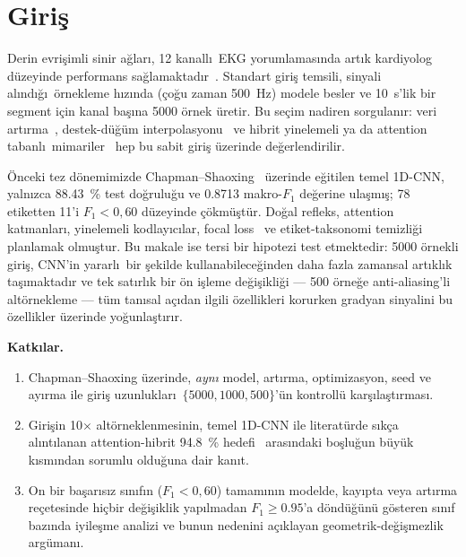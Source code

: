 \documentclass[conference]{IEEEtran}
\begin{document}
\section{Giri\c{s}}
Derin evri\c{s}imli sinir a\u{g}lar\i, 12 kanall\i\ EKG yorumlamas\i nda
art\i k kardiyolog d\"{u}zeyinde performans
sa\u{g}lamaktad\i r~\cite{rajpurkar2017,hannun2019,strodthoff2020}.
Standart giri\c{s} temsili, sinyali al\i nd\i\u{g}\i\ \"{o}rnekleme h\i z\i nda
(\c{c}o\u{g}u zaman \SI{500}{\hertz}) modele besler ve
\SI{10}{\second}'lik bir segment i\c{c}in kanal ba\c{s}\i na \num{5000}
\"{o}rnek \"{u}retir. Bu se\c{c}im nadiren sorgulan\i r: veri
art\i rma~\cite{iwana2021,wang2020}, destek-d\"{u}\u{g}\"{u}m
interpolasyonu~\cite{chen2021,xu2022} ve hibrit yinelemeli ya da
attention tabanl\i\ mimariler~\cite{oh2018,strodthoff2020} hep bu sabit
giri\c{s} \"{u}zerinde de\u{g}erlendirilir.

\"{O}nceki tez d\"{o}nemimizde Chapman--Shaoxing~\cite{zheng2020} \"{u}zerinde
e\u{g}itilen temel 1D-CNN, yaln\i zca \SI{88,43}{\percent} test
do\u{g}rulu\u{g}u ve \num{0,8713} makro-$F_1$ de\u{g}erine ula\c{s}m\i\c{s};
\num{78} etiketten \num{11}'i $F_1<0,60$ d\"{u}zeyinde
\c{c}\"{o}km\"{u}\c{s}t\"{u}r. Do\u{g}al refleks, attention katmanlar\i,
yinelemeli kodlay\i c\i lar, focal loss~\cite{lin2017} ve etiket-taksonomi
temizli\u{g}i planlamak olmu\c{s}tur. Bu makale ise tersi bir hipotezi
test etmektedir: \num{5000} \"{o}rnekli giri\c{s}, CNN'in yararl\i\ bir
\c{s}ekilde kullanabilece\u{g}inden daha fazla zamansal art\i kl\i k
ta\c{s}\i maktad\i r ve tek sat\i rl\i k bir \"{o}n i\c{s}leme
de\u{g}i\c{s}ikli\u{g}i --- \num{500} \"{o}rne\u{g}e anti-aliasing'li
alt\"{o}rnekleme --- t\"{u}m tan\i sal a\c{c}\i dan ilgili \"{o}zellikleri
korurken gradyan sinyalini bu \"{o}zellikler \"{u}zerinde
yo\u{g}unla\c{s}t\i r\i r.

\noindent\textbf{Katk\i lar.}
\begin{enumerate}
  \item Chapman--Shaoxing \"{u}zerinde, \emph{ayn\i} model, art\i rma,
        optimizasyon, seed ve ay\i rma ile giri\c{s} uzunluklar\i\
        $\{\num{5000}, \num{1000}, \num{500}\}$'\"{u}n kontroll\"{u}
        kar\c{s}\i la\c{s}t\i rmas\i.
  \item Giri\c{s}in 10$\times$ alt\"{o}rneklenmesinin, temel 1D-CNN ile
        literat\"{u}rde s\i k\c{c}a al\i nt\i lanan attention-hibrit
        \SI{94,8}{\percent} hedefi~\cite{oh2018} aras\i ndaki bo\c{s}lu\u{g}un
        b\"{u}y\"{u}k k\i sm\i ndan sorumlu oldu\u{g}una dair kan\i t.
  \item On bir ba\c{s}ar\i s\i z s\i n\i f\i n ($F_1<0,60$) tamam\i n\i n
        modelde, kay\i pta veya art\i rma re\c{c}etesinde hi\c{c}bir
        de\u{g}i\c{s}iklik yap\i lmadan $F_1\geq\num{0,95}$'a d\"{o}nd\"{u}\u{g}\"{u}n\"{u}
        g\"{o}steren s\i n\i f baz\i nda iyile\c{s}me analizi ve bunun
        nedenini a\c{c}\i klayan geometrik-de\u{g}i\c{s}mezlik
        arg\"{u}man\i.
\end{enumerate}
\end{document}
